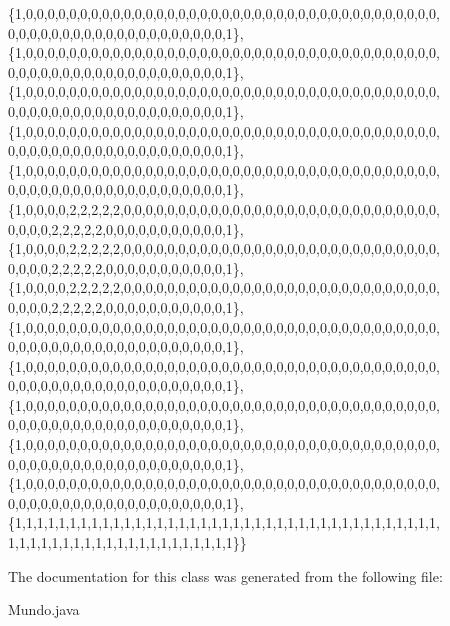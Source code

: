 \begin{DoxyCode}
                            \{1,0,0,0,0,0,0,0,0,0,0,0,0,0,0,0,0,0,0,0,0,0,0,0,0,0,0,0,0,0,0,0,0,0,0,0,0,0,0,
      0,0,0,0,0,0,0,0,0,0,0,0,0,0,0,0,0,0,0,0,1\},
                            \{1,0,0,0,0,0,0,0,0,0,0,0,0,0,0,0,0,0,0,0,0,0,0,0,0,0,0,0,0,0,0,0,0,0,0,0,0,0,0,
      0,0,0,0,0,0,0,0,0,0,0,0,0,0,0,0,0,0,0,0,1\},
                            \{1,0,0,0,0,0,0,0,0,0,0,0,0,0,0,0,0,0,0,0,0,0,0,0,0,0,0,0,0,0,0,0,0,0,0,0,0,0,0,
      0,0,0,0,0,0,0,0,0,0,0,0,0,0,0,0,0,0,0,0,1\},
                            \{1,0,0,0,0,0,0,0,0,0,0,0,0,0,0,0,0,0,0,0,0,0,0,0,0,0,0,0,0,0,0,0,0,0,0,0,0,0,0,
      0,0,0,0,0,0,0,0,0,0,0,0,0,0,0,0,0,0,0,0,1\},
                            \{1,0,0,0,0,0,0,0,0,0,0,0,0,0,0,0,0,0,0,0,0,0,0,0,0,0,0,0,0,0,0,0,0,0,0,0,0,0,0,
      0,0,0,0,0,0,0,0,0,0,0,0,0,0,0,0,0,0,0,0,1\},
                            \{1,0,0,0,0,2,2,2,2,2,0,0,0,0,0,0,0,0,0,0,0,0,0,0,0,0,0,0,0,0,0,0,0,0,0,0,0,0,0,
      0,0,0,0,2,2,2,2,2,0,0,0,0,0,0,0,0,0,0,0,1\},
                            \{1,0,0,0,0,2,2,2,2,2,0,0,0,0,0,0,0,0,0,0,0,0,0,0,0,0,0,0,0,0,0,0,0,0,0,0,0,0,0,
      0,0,0,0,2,2,2,2,2,0,0,0,0,0,0,0,0,0,0,0,1\},
                            \{1,0,0,0,0,2,2,2,2,2,0,0,0,0,0,0,0,0,0,0,0,0,0,0,0,0,0,0,0,0,0,0,0,0,0,0,0,0,0,
      0,0,0,0,2,2,2,2,2,0,0,0,0,0,0,0,0,0,0,0,1\},
                            \{1,0,0,0,0,0,0,0,0,0,0,0,0,0,0,0,0,0,0,0,0,0,0,0,0,0,0,0,0,0,0,0,0,0,0,0,0,0,0,
      0,0,0,0,0,0,0,0,0,0,0,0,0,0,0,0,0,0,0,0,1\},
                            \{1,0,0,0,0,0,0,0,0,0,0,0,0,0,0,0,0,0,0,0,0,0,0,0,0,0,0,0,0,0,0,0,0,0,0,0,0,0,0,
      0,0,0,0,0,0,0,0,0,0,0,0,0,0,0,0,0,0,0,0,1\},
                            \{1,0,0,0,0,0,0,0,0,0,0,0,0,0,0,0,0,0,0,0,0,0,0,0,0,0,0,0,0,0,0,0,0,0,0,0,0,0,0,
      0,0,0,0,0,0,0,0,0,0,0,0,0,0,0,0,0,0,0,0,1\},
                            \{1,0,0,0,0,0,0,0,0,0,0,0,0,0,0,0,0,0,0,0,0,0,0,0,0,0,0,0,0,0,0,0,0,0,0,0,0,0,0,
      0,0,0,0,0,0,0,0,0,0,0,0,0,0,0,0,0,0,0,0,1\},
                            \{1,0,0,0,0,0,0,0,0,0,0,0,0,0,0,0,0,0,0,0,0,0,0,0,0,0,0,0,0,0,0,0,0,0,0,0,0,0,0,
      0,0,0,0,0,0,0,0,0,0,0,0,0,0,0,0,0,0,0,0,1\},
                            \{1,1,1,1,1,1,1,1,1,1,1,1,1,1,1,1,1,1,1,1,1,1,1,1,1,1,1,1,1,1,1,1,1,1,1,1,1,1,1,
      1,1,1,1,1,1,1,1,1,1,1,1,1,1,1,1,1,1,1,1,1\}\}
\end{DoxyCode}


The documentation for this class was generated from the following file\+:\begin{DoxyCompactItemize}
\item 
Mundo.\+java\end{DoxyCompactItemize}
